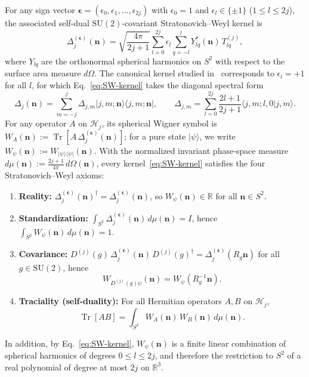 \documentclass[11pt,a4paper]{article}
\theoremstyle{remark}
\newcommand{\ket}[1]{\lvert #1 \rangle}
\newcommand{\bra}[1]{\langle #1 \rvert}
\newcommand{\braket}[2]{\langle #1 \vert #2 \rangle}
\newcommand{\Tr}{\operatorname{Tr}}
\newcommand{\bn}{\mathbf{n}}
\begin{document}
For any sign vector $\boldsymbol{\epsilon} = (\epsilon_0, \epsilon_1, \dots, \epsilon_{2j})$ with $\epsilon_0 = 1$ and $\epsilon_l \in \{\pm 1\}$ ($1 \le l \le 2j$), the associated self-dual $\mathrm{SU}(2)$-covariant Stratonovich--Weyl kernel is
\begin{equation}\label{eq:SW-kernel}
\Delta_j^{(\boldsymbol{\epsilon})}(\bn)
= \sqrt{\frac{4\pi}{2j+1}} \sum_{l=0}^{2j} \epsilon_l \sum_{q=-l}^{l} Y_{lq}^*(\bn)\, T^{(j)}_{lq},
\end{equation}
where $Y_{lq}$ are the orthonormal spherical harmonics on $S^2$ with respect to the surface area measure $d\Omega$. The canonical kernel studied in~\cite{VarillyGraciaBondia1989,Davis2021,Davis2023,Kam2026} corresponds to $\epsilon_l = +1$ for all $l$, for which Eq.~\eqref{eq:SW-kernel} takes the diagonal spectral form
\begin{equation}\label{eq:SW-canonical}
\Delta_j(\bn) = \sum_{m=-j}^{j} \Delta_{j,m} \ket{j,m;\bn}\bra{j,m;\bn}, \qquad
\Delta_{j,m} = \sum_{l=0}^{2j} \frac{2l+1}{2j+1} \braket{j,m; l,0}{j,m}.
\end{equation}
For any operator $A$ on $\mathcal{H}_j$, its spherical Wigner symbol is $W_A(\bn) := \Tr[A\,\Delta_j^{(\boldsymbol{\epsilon})}(\bn)]$; for a pure state $\ket{\psi}$, we write $W_\psi(\bn) := W_{\ket{\psi}\bra{\psi}}(\bn)$. With the normalized invariant phase-space measure $d\mu(\bn) := \frac{2j+1}{4\pi}\,d\Omega(\bn)$, every kernel~\eqref{eq:SW-kernel} satisfies the four Stratonovich--Weyl axioms:
\begin{enumerate}
\item \textbf{Reality:} $\Delta_j^{(\boldsymbol{\epsilon})}(\bn)^\dagger = \Delta_j^{(\boldsymbol{\epsilon})}(\bn)$, so $W_\psi(\bn) \in \mathbb{R}$ for all $\bn \in S^2$.
\item \textbf{Standardization:} $\int_{S^2} \Delta_j^{(\boldsymbol{\epsilon})}(\bn)\,d\mu(\bn) = I$, hence $\int_{S^2} W_\psi(\bn)\,d\mu(\bn) = 1$.
\item \textbf{Covariance:} $D^{(j)}(g)\,\Delta_j^{(\boldsymbol{\epsilon})}(\bn)\,D^{(j)}(g)^\dagger = \Delta_j^{(\boldsymbol{\epsilon})}(R_g \bn)$ for all $g \in \mathrm{SU}(2)$, hence
\begin{equation}\label{eq:covariance}
W_{D^{(j)}(g)\psi}(\bn) = W_\psi(R_g^{-1}\bn).
\end{equation}
\item \textbf{Traciality (self-duality):} For all Hermitian operators $A, B$ on $\mathcal{H}_j$,
\begin{equation}\label{eq:traciality}
\Tr[AB] = \int_{S^2} W_A(\bn)\,W_B(\bn)\,d\mu(\bn).
\end{equation}
\end{enumerate}
In addition, by Eq.~\eqref{eq:SW-kernel}, $W_\psi(\bn)$ is a finite linear combination of spherical harmonics of degrees $0 \le l \le 2j$, and therefore the restriction to $S^2$ of a real polynomial of degree at most $2j$ on $\mathbb{R}^3$.
\end{document}

